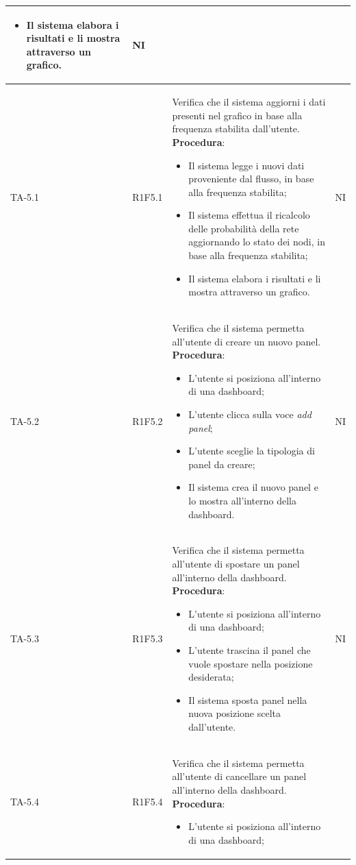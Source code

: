 \begin{longtable}{|C{2.5cm}|C{2.5cm}|L{6.5cm}|C{1.5cm}|}
\begin{itemize}
		\item Il sistema elabora i risultati e li mostra attraverso un grafico.
	\end{itemize}
	 & {NI}\\
	\hline
	{TA-5.1} & {R1F5.1} & 
	Verifica che il sistema aggiorni i dati presenti nel grafico in base alla frequenza stabilita dall'utente.
	\textbf{Procedura}:
	\begin{itemize}		
		\item Il sistema legge i nuovi dati proveniente dal flusso, in base alla frequenza stabilita;
		\item Il sistema effettua il ricalcolo delle probabilità della rete aggiornando lo stato dei nodi, in base alla frequenza stabilita;
		\item Il sistema elabora i risultati e li mostra attraverso un grafico.
	\end{itemize}
	 & {NI}\\
	\hline
	{TA-5.2} & {R1F5.2} & 
	Verifica che il sistema permetta all'utente di creare un nuovo panel.
	\textbf{Procedura}:
	\begin{itemize}		
		\item L'utente si posiziona all'interno di una dashboard;
		\item L'utente clicca sulla voce \emph{add panel};
		\item L'utente sceglie la tipologia di panel da creare;
		\item Il sistema crea il nuovo panel e lo mostra all'interno della dashboard.
	\end{itemize}
	 & {NI}\\
	\hline
	{TA-5.3} & {R1F5.3} & 
	Verifica che il sistema permetta all'utente di spostare un panel all'interno della dashboard.
	\textbf{Procedura}:
	\begin{itemize}		
		\item L'utente si posiziona all'interno di una dashboard;
		\item L'utente trascina il panel che vuole spostare nella posizione desiderata;
		\item Il sistema sposta panel nella nuova posizione scelta dall'utente.
	\end{itemize}
	 & {NI}\\
	\hline
	{TA-5.4} & {R1F5.4} & 
	Verifica che il sistema permetta all'utente di cancellare un panel all'interno della dashboard.
	\textbf{Procedura}:
	\begin{itemize}		
		\item L'utente si posiziona all'interno di una dashboard;

\end{itemize}
\end{longtable}

